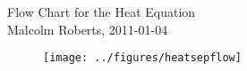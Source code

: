 \documentclass[12pt]{article}
\begin{document}
\pagestyle{empty}


\begin{center}
{\large  Flow Chart for the Heat Equation}
\\
\vspace{0.3cm}
{\small Malcolm Roberts, 2011-01-04}
\end{center}
\vspace{1cm}

\begin{figure}[h]
  \centering
  \texttt{[image: ../figures/heatsepflow]}
\end{figure}
\end{document}
